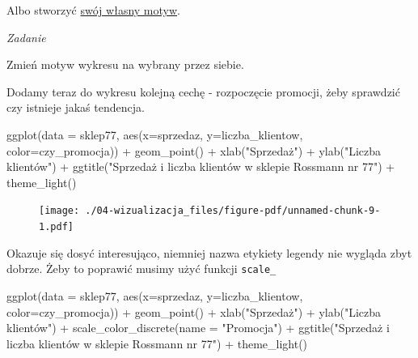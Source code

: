 \documentclass[
  letterpaper,
  DIV=11,
  numbers=noendperiod]{scrreprt}
\newenvironment{Shaded}{\begin{snugshade}}{\end{snugshade}}
\newcommand{\AttributeTok}[1]{\textcolor[rgb]{0.40,0.45,0.13}{#1}}
\newcommand{\FunctionTok}[1]{\textcolor[rgb]{0.28,0.35,0.67}{#1}}
\newcommand{\NormalTok}[1]{\textcolor[rgb]{0.00,0.23,0.31}{#1}}
\newcommand{\SpecialCharTok}[1]{\textcolor[rgb]{0.37,0.37,0.37}{#1}}
\newcommand{\StringTok}[1]{\textcolor[rgb]{0.13,0.47,0.30}{#1}}
\begin{document}
Albo stworzyć
\href{https://www.statworx.com/de/blog/custom-themes-in-ggplot2/}{swój
własny motyw}.

\emph{Zadanie}

Zmień motyw wykresu na wybrany przez siebie.

Dodamy teraz do wykresu kolejną cechę - rozpoczęcie promocji, żeby
sprawdzić czy istnieje jakaś tendencja.

\begin{Shaded}
\begin{Highlighting}[]
\FunctionTok{ggplot}\NormalTok{(}\AttributeTok{data =}\NormalTok{ sklep77, }\FunctionTok{aes}\NormalTok{(}\AttributeTok{x=}\NormalTok{sprzedaz, }\AttributeTok{y=}\NormalTok{liczba\_klientow, }\AttributeTok{color=}\NormalTok{czy\_promocja)) }\SpecialCharTok{+}
  \FunctionTok{geom\_point}\NormalTok{() }\SpecialCharTok{+}
  \FunctionTok{xlab}\NormalTok{(}\StringTok{"Sprzedaż"}\NormalTok{) }\SpecialCharTok{+}
  \FunctionTok{ylab}\NormalTok{(}\StringTok{"Liczba klientów"}\NormalTok{) }\SpecialCharTok{+}
  \FunctionTok{ggtitle}\NormalTok{(}\StringTok{"Sprzedaż i liczba klientów w sklepie Rossmann nr 77"}\NormalTok{) }\SpecialCharTok{+}
  \FunctionTok{theme\_light}\NormalTok{()}
\end{Highlighting}
\end{Shaded}

\begin{figure}[H]

{\centering \texttt{[image: ./04-wizualizacja\_files/figure-pdf/unnamed-chunk-9-1.pdf]}

}

\end{figure}

Okazuje się dosyć interesująco, niemniej nazwa etykiety legendy nie
wygląda zbyt dobrze. Żeby to poprawić musimy użyć funkcji
\texttt{scale\_}

\begin{Shaded}
\begin{Highlighting}[]
\FunctionTok{ggplot}\NormalTok{(}\AttributeTok{data =}\NormalTok{ sklep77, }\FunctionTok{aes}\NormalTok{(}\AttributeTok{x=}\NormalTok{sprzedaz, }\AttributeTok{y=}\NormalTok{liczba\_klientow, }\AttributeTok{color=}\NormalTok{czy\_promocja)) }\SpecialCharTok{+}
  \FunctionTok{geom\_point}\NormalTok{() }\SpecialCharTok{+}
  \FunctionTok{xlab}\NormalTok{(}\StringTok{"Sprzedaż"}\NormalTok{) }\SpecialCharTok{+}
  \FunctionTok{ylab}\NormalTok{(}\StringTok{"Liczba klientów"}\NormalTok{) }\SpecialCharTok{+}
  \FunctionTok{scale\_color\_discrete}\NormalTok{(}\AttributeTok{name =} \StringTok{"Promocja"}\NormalTok{) }\SpecialCharTok{+}
  \FunctionTok{ggtitle}\NormalTok{(}\StringTok{"Sprzedaż i liczba klientów w sklepie Rossmann nr 77"}\NormalTok{) }\SpecialCharTok{+}
  \FunctionTok{theme\_light}\NormalTok{()}
\end{Highlighting}
\end{Shaded}
\end{document}
